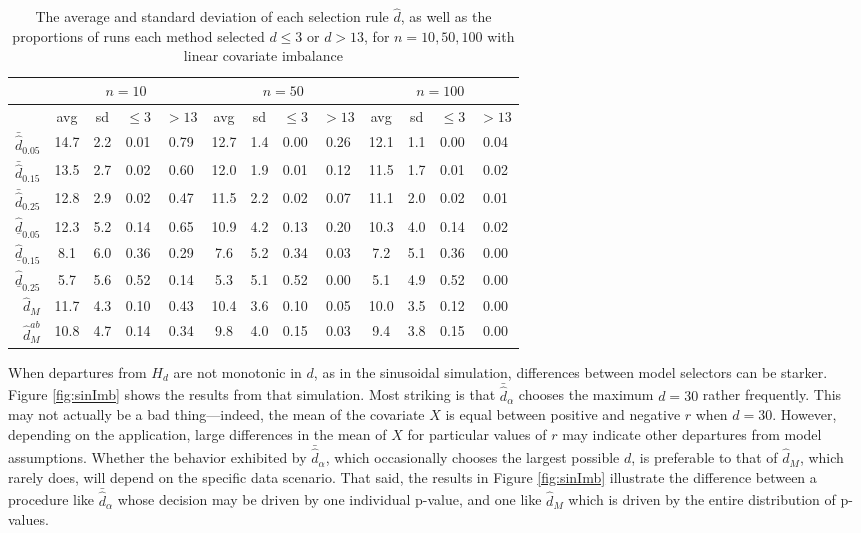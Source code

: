 \documentclass[12pt]{article}\usepackage[]{graphicx}\usepackage[]{color}
\newcommand{\dalphaU}{\bar{\hat{d}}_\alpha}
\newcommand{\dhatU}{\bar{\hat{d}}}
\newcommand{\dhatB}{\underline{\hat{d}}}
\newcommand{\dhatm}{\hat{d}_M}
\newcommand{\dhatmab}{\hat{d}^{ab}_M}
\begin{document}
\begin{table}[ht]
\centering
\begin{tabular}{r|cccc|cccc|cccc|}
  & \multicolumn{4}{c}{$n=10$}&\multicolumn{4}{c}{$n=50$} &\multicolumn{4}{c}{$n=100$}\\
 \hline
 & avg & sd & $\le 3$ & $>13$ & avg & sd & $\le 3$ & $>13$ & avg & sd & $\le 3$ & $>13$ \\ 
  \hline
$\dhatU_{0.05}$ & 14.7 & 2.2 & 0.01 & 0.79 & 12.7 & 1.4 & 0.00 & 0.26 & 12.1 & 1.1 & 0.00 & 0.04 \\ 
  $\dhatU_{0.15}$ & 13.5 & 2.7 & 0.02 & 0.60 & 12.0 & 1.9 & 0.01 & 0.12 & 11.5 & 1.7 & 0.01 & 0.02 \\ 
  $\dhatU_{0.25}$ & 12.8 & 2.9 & 0.02 & 0.47 & 11.5 & 2.2 & 0.02 & 0.07 & 11.1 & 2.0 & 0.02 & 0.01 \\ 
  $\dhatB_{0.05}$ & 12.3 & 5.2 & 0.14 & 0.65 & 10.9 & 4.2 & 0.13 & 0.20 & 10.3 & 4.0 & 0.14 & 0.02 \\ 
  $\dhatB_{0.15}$ & 8.1 & 6.0 & 0.36 & 0.29 & 7.6 & 5.2 & 0.34 & 0.03 & 7.2 & 5.1 & 0.36 & 0.00 \\ 
  $\dhatB_{0.25}$ & 5.7 & 5.6 & 0.52 & 0.14 & 5.3 & 5.1 & 0.52 & 0.00 & 5.1 & 4.9 & 0.52 & 0.00 \\ 
  $\dhatm$ & 11.7 & 4.3 & 0.10 & 0.43 & 10.4 & 3.6 & 0.10 & 0.05 & 10.0 & 3.5 & 0.12 & 0.00 \\ 
  $\dhatmab$ & 10.8 & 4.7 & 0.14 & 0.34 & 9.8 & 4.0 & 0.15 & 0.03 & 9.4 & 3.8 & 0.15 & 0.00 \\ 
   \hline
\end{tabular}
\caption{The average and standard deviation of each selection rule $\hat{d}$, as well as the proportions of runs each method selected $d\le 3$ or $d>13$, for $n=10,50,100$ with linear covariate imbalance} 
\label{tab:linear}
\end{table}


When departures from $H_d$ are not monotonic in $d$, as in the
sinusoidal simulation, differences between model selectors can be
starker.
Figure \ref{fig:sinImb} shows the results from that simulation.
Most striking is that $\dalphaU$ chooses the maximum $d=30$ rather
frequently.
This may not actually be a bad thing---indeed, the mean of the
covariate $X$ is equal between positive and negative $r$ when $d=30$.
However, depending on the application, large differences in the mean
of $X$ for particular values of $r$ may indicate other departures from
model assumptions.
Whether the behavior exhibited by $\dalphaU$, which occasionally
chooses the largest possible $d$, is preferable to that of $\dhatm$,
which rarely does, will depend on the specific data scenario.
That said, the results in Figure \ref{fig:sinImb} illustrate the
difference between a procedure like $\dalphaU$ whose decision may be driven by one
individual p-value, and one like $\dhatm$ which is driven by the
entire distribution of p-values.
\end{document}
